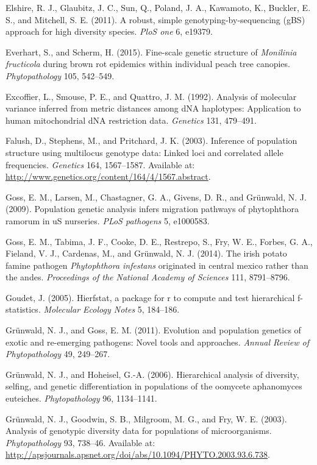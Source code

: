 \documentclass{frontiersSCNS} %
\begin{document}
Elshire, R. J., Glaubitz, J. C., Sun, Q., Poland, J. A., Kawamoto, K.,
Buckler, E. S., and Mitchell, S. E. (2011). A robust, simple
genotyping-by-sequencing (gBS) approach for high diversity species.
\emph{PloS one} 6, e19379.

Everhart, S., and Scherm, H. (2015). Fine-scale genetic structure of
\emph{Monilinia fructicola} during brown rot epidemics within individual
peach tree canopies. \emph{Phytopathology} 105, 542--549.

Excoffier, L., Smouse, P. E., and Quattro, J. M. (1992). Analysis of
molecular variance inferred from metric distances among dNA haplotypes:
Application to human mitochondrial dNA restriction data. \emph{Genetics}
131, 479--491.

Falush, D., Stephens, M., and Pritchard, J. K. (2003). Inference of
population structure using multilocus genotype data: Linked loci and
correlated allele frequencies. \emph{Genetics} 164, 1567--1587.
Available at: \url{http://www.genetics.org/content/164/4/1567.abstract}.

Goss, E. M., Larsen, M., Chastagner, G. A., Givens, D. R., and
Gr{ü}nwald, N. J. (2009). Population genetic analysis infers migration
pathways of phytophthora ramorum in uS nurseries. \emph{PLoS pathogens}
5, e1000583.

Goss, E. M., Tabima, J. F., Cooke, D. E., Restrepo, S., Fry, W. E.,
Forbes, G. A., Fieland, V. J., Cardenas, M., and Gr{ü}nwald, N. J.
(2014). The irish potato famine pathogen \emph{Phytophthora infestans}
originated in central mexico rather than the andes. \emph{Proceedings of
the National Academy of Sciences} 111, 8791--8796.

Goudet, J. (2005). Hierfstat, a package for r to compute and test
hierarchical f-statistics. \emph{Molecular Ecology Notes} 5, 184--186.

Grünwald, N. J., and Goss, E. M. (2011). Evolution and population
genetics of exotic and re-emerging pathogens: Novel tools and
approaches. \emph{Annual Review of Phytopathology} 49, 249--267.

Gr{ü}nwald, N. J., and Hoheisel, G.-A. (2006). Hierarchical analysis of
diversity, selfing, and genetic differentiation in populations of the
oomycete aphanomyces euteiches. \emph{Phytopathology} 96, 1134--1141.

Grünwald, N. J., Goodwin, S. B., Milgroom, M. G., and Fry, W. E. (2003).
Analysis of genotypic diversity data for populations of microorganisms.
\emph{Phytopathology} 93, 738--46. Available at:
\url{http://apsjournals.apsnet.org/doi/abs/10.1094/PHYTO.2003.93.6.738}.
\end{document}

